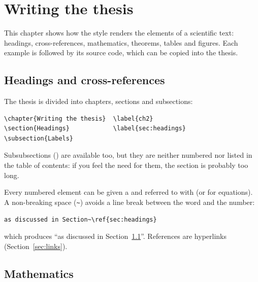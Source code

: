 \chapter{Writing the thesis} \label{ch2}

This chapter shows how the style renders the elements of a scientific text:
headings, cross-references, mathematics, theorems, tables and figures. Each
example is followed by its source code, which can be copied into the thesis.

\section{Headings and cross-references} \label{sec:headings}

The thesis is divided into chapters, sections and subsections:
\begin{Verbatim}
\chapter{Writing the thesis}  \label{ch2}
\section{Headings}            \label{sec:headings}
\subsection{Labels}
\end{Verbatim}
Subsubsections () are available too, but they are neither
numbered nor listed in the table of contents: if you feel the need for
them, the section is probably too long.

Every numbered element can be given a  and referred to with
 (or  for equations). A non-breaking space (\verb|~|)
avoids a line break between the word and the number:
\begin{Verbatim}
as discussed in Section~\ref{sec:headings}
\end{Verbatim}
which produces ``as discussed in Section~\ref{sec:headings}''. References
are hyperlinks (Section~\ref{sec:links}).

\section{Mathematics} \label{sec:math}

